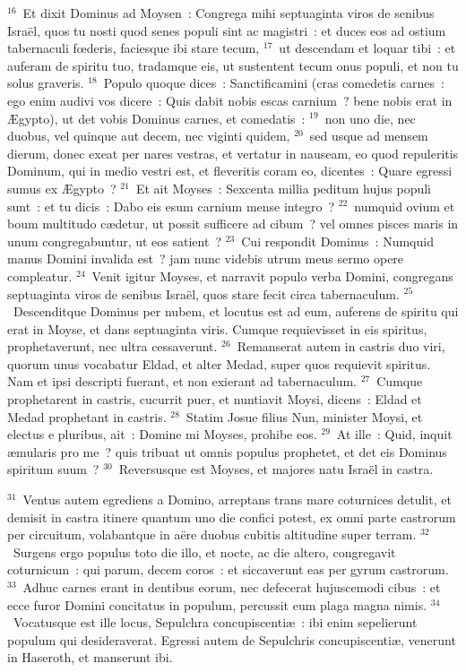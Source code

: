 ${}^{16}$~Et dixit Dominus ad Moysen~: Congrega mihi septuaginta viros de senibus Isra\"el, quos tu nosti quod senes populi sint ac magistri~: et duces eos ad ostium tabernaculi fœderis, faciesque ibi stare tecum,
${}^{17}$~ut descendam et loquar tibi~: et auferam de spiritu tuo, tradamque eis, ut sustentent tecum onus populi, et non tu solus graveris.
${}^{18}$~Populo quoque dices~: Sanctificamini (cras comedetis carnes~: ego enim audivi vos dicere~: Quis dabit nobis escas carnium~? bene nobis erat in \AE gypto), ut det vobis Dominus carnes, et comedatis~:
${}^{19}$~non uno die, nec duobus, vel quinque aut decem, nec viginti quidem,
${}^{20}$~sed usque ad mensem dierum, donec exeat per nares vestras, et vertatur in nauseam, eo quod repuleritis Dominum, qui in medio vestri est, et fleveritis coram eo, dicentes~: Quare egressi sumus ex \AE gypto~?
${}^{21}$~Et ait Moyses~: Sexcenta millia peditum hujus populi sunt~: et tu dicis~: Dabo eis esum carnium mense integro~?
${}^{22}$~numquid ovium et boum multitudo c\ae detur, ut possit sufficere ad cibum~? vel omnes pisces maris in unum congregabuntur, ut eos satient~?
${}^{23}$~Cui respondit Dominus~: Numquid manus Domini invalida est~? jam nunc videbis utrum meus sermo opere compleatur.
${}^{24}$~Venit igitur Moyses, et narravit populo verba Domini, congregans septuaginta viros de senibus Isra\"el, quos stare fecit circa tabernaculum.
${}^{25}$~Descenditque Dominus per nubem, et locutus est ad eum, auferens de spiritu qui erat in Moyse, et dans septuaginta viris. Cumque requievisset in eis spiritus, prophetaverunt, nec ultra cessaverunt.
${}^{26}$~Remanserat autem in castris duo viri, quorum unus vocabatur Eldad, et alter Medad, super quos requievit spiritus. Nam et ipsi descripti fuerant, et non exierant ad tabernaculum.
${}^{27}$~Cumque prophetarent in castris, cucurrit puer, et nuntiavit Moysi, dicens~: Eldad et Medad prophetant in castris.
${}^{28}$~Statim Josue filius Nun, minister Moysi, et electus e pluribus, ait~: Domine mi Moyses, prohibe eos.
${}^{29}$~At ille~: Quid, inquit \ae mularis pro me~? quis tribuat ut omnis populus prophetet, et det eis Dominus spiritum suum~?
${}^{30}$~Reversusque est Moyses, et majores natu Isra\"el in castra.


${}^{31}$~Ventus autem egrediens a Domino, arreptans trans mare coturnices detulit, et demisit in castra itinere quantum uno die confici potest, ex omni parte castrorum per circuitum, volabantque in a\"ere duobus cubitis altitudine super terram.
${}^{32}$~Surgens ergo populus toto die illo, et nocte, ac die altero, congregavit coturnicum~: qui parum, decem coros~: et siccaverunt eas per gyrum castrorum.
${}^{33}$~Adhuc carnes erant in dentibus eorum, nec defecerat hujuscemodi cibus~: et ecce furor Domini concitatus in populum, percussit eum plaga magna nimis.
${}^{34}$~Vocatusque est ille locus, Sepulchra concupiscenti\ae~: ibi enim sepelierunt populum qui desideraverat. Egressi autem de Sepulchris concupiscenti\ae , venerunt in Haseroth, et manserunt ibi.

